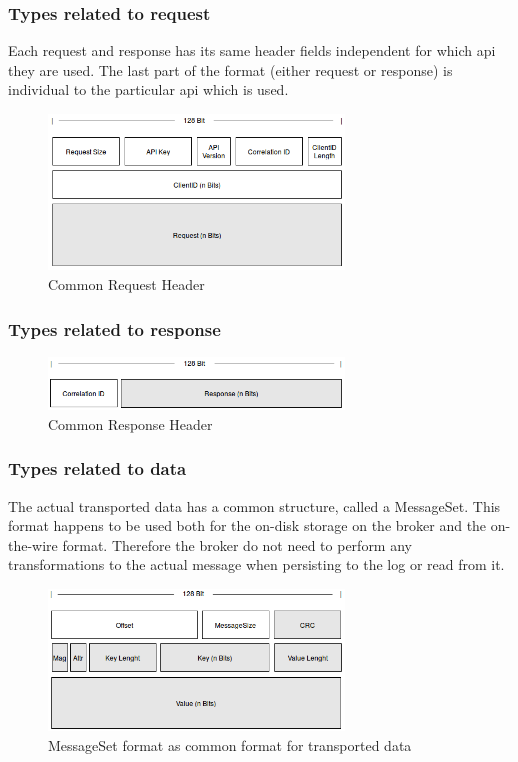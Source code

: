\subsubsection{Types related to request}
Each request and response has its same header fields independent for which api they are used. 
The last part of the format (either request or response) is individual to the particular api which is used. 
\begin{figure}[H]
    \centering
    \includegraphics[width=0.7\textwidth]{images/protocol-request-header.png}
    \caption{Common Request Header}
    \label{fig:protocol-request-header.png}
\end{figure}

\subsubsection{Types related to response}
\begin{figure}[H]
    \centering
    \includegraphics[width=0.7\textwidth]{images/protocol-response-header.png}
    \caption{Common Response Header}
    \label{fig:protocol-response-header.png}
\end{figure}

\subsubsection{Types related to data}
\label{impl-protocol-types-data}
The actual transported data has a common structure,
called a MessageSet. This format happens to be used both for the on-disk storage on the
broker and the on-the-wire format. Therefore the broker do not need to perform
any transformations to the actual message when persisting to the log or read
from it. 

\begin{figure}[H]
    \centering
    \includegraphics[width=0.7\textwidth]{images/protocol-messageSet.png}
    \caption{MessageSet format as common format for transported data}
    \label{fig:protocol-request-header.png}
\end{figure}

